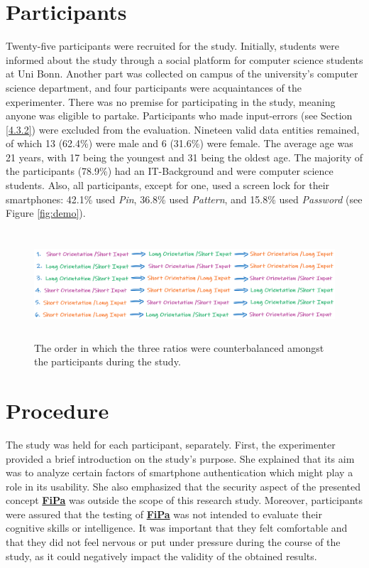 \section{Participants} \label{5.2}

Twenty-five participants were recruited for the study. Initially, students were informed about the study through a social platform for computer science students at Uni Bonn. Another part was collected on campus of the university's computer science department, and four participants were acquaintances of the experimenter. There was no premise for participating in the study, meaning anyone was eligible to partake. Participants who made input-errors (see Section \ref{4.3.2}) were excluded from the evaluation. Nineteen valid data entities remained, of which 13 (62.4\%) were male and 6 (31.6\%) were female. The average age was 21 years, with 17 being the youngest and 31 being the oldest age. The majority of the participants (78.9\%) had an IT-Background and were computer science students. Also, all participants, except for one, used a screen lock for their smartphones: 42.1\% used \textit{Pin}, 36.8\% used \textit{Pattern}, and 15.8\% used \textit{Password} (see Figure \ref{fig:demo}). 

\begin{figure}[t!]
\centering
\includegraphics[width=14cm, height=4cm]{Chapters/graphics/permutation.PNG}
\caption{The order in which the three ratios were counterbalanced amongst the participants during the study.}
\label{fig:permutation}
\end{figure}


\section{Procedure} \label{5.3}
The study was held for each participant, separately. First, the experimenter provided a brief introduction on the study's purpose. She explained that its aim was to analyze certain factors of smartphone authentication which might play a role in its usability. She also emphasized that the security aspect of the presented concept \underline{\textbf{FiPa}}  was outside the scope of this research study. Moreover, participants were assured that the testing of \underline{\textbf{FiPa}} was not intended to evaluate their cognitive skills or intelligence. It was important that they felt comfortable and that they did not feel nervous or put under pressure during the course of the study, as it could negatively impact the validity of the obtained results.\\

